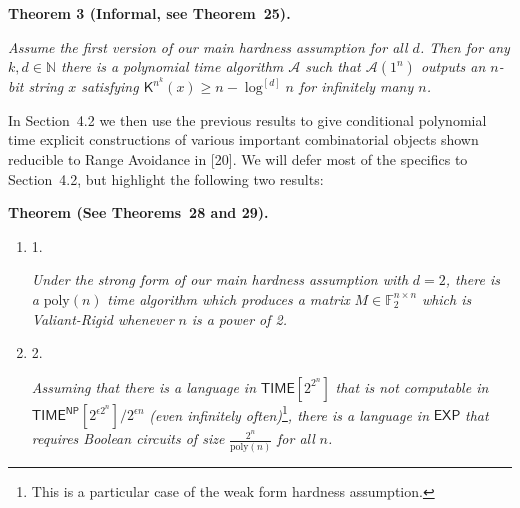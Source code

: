 \documentclass[10pt,a4paper]{article}
\begin{document}


\par\medskip\noindent\textbf{
\textbf{Theorem 3}\textbf{ }(Informal, see Theorem 25)\textbf{.}
}\par



\emph{Assume the first version of our main hardness assumption for all $d$.
Then for any $k,d\in\mathbb{N}$ there is a polynomial time algorithm $\mathcal{A}$ such that $\mathcal{A}(1^{n})$ outputs an $n$-bit string $x$ satisfying ${\mathsf{K}}^{n^{k}}(x)\geq n-\log^{[d]}n$ for infinitely many $n$.}\par






In Section 4.2 we then use the previous results to give conditional polynomial time explicit constructions of various important combinatorial objects shown reducible to Range Avoidance in [20]. We will defer most of the specifics to Section 4.2, but highlight the following two results:\par





\par\medskip\noindent\textbf{
\textbf{Theorem}\textbf{ }(See Theorems 28 and 29)\textbf{.}
}\par



\begin{enumerate}


\item[] 
1. 


\emph{Under the strong form of our main hardness assumption with }$d=2$\emph{, there is a }$\mathrm{poly}(n)$\emph{ time algorithm which produces a matrix }$M\in\mathbb{F}_{2}^{n\times n}$\emph{ which is Valiant-Rigid whenever }$n$\emph{ is a power of 2.}\par





\item[] 
2. 


\emph{Assuming that there is a language in }${\mathsf{TIME}}[2^{2^{n}}]$\emph{ that is not computable in }${\mathsf{TIME}}^{\mathsf{NP}}[2^{\epsilon 2^{n}}]/2^{\epsilon n}$\emph{ (even infinitely often)}\footnote{This is a particular case of the weak form hardness assumption.}\emph{, there is a language in }${\mathsf{EXP}}$\emph{ that requires Boolean circuits of size }$\frac{2^{n}}{\mathrm{poly}(n)}$\emph{ for all }$n$\emph{.}\par





\end{enumerate}
\end{document}
